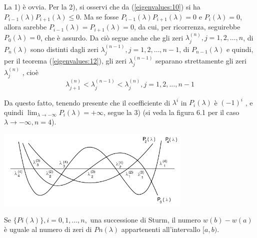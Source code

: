 \begin{thproof}
 La 1) \`e ovvia. Per la 2), si osservi che da
(\ref{eigenvalues:10}) si ha $P_{i−1} (\lambda)P_{i+1}(\lambda) \leq 0$.
Ma se fosse $P_{i−1} (\lambda)P_{i+1} (\lambda) = 0 $ e $P_i (\lambda)
= 0$, allora sarebbe $P_{i−1} (\lambda) = P_{i+1} (\lambda) = 0$, da
cui, per ricorrenza, seguirebbe $P_0 (\lambda) = 0$, che \`e assurdo.
Da ci\`o segue anche che gli zeri $\lambda_j^{(n)} , j = 1, 2, \ldots , n$,
 di $P_n (\lambda)$ sono distinti dagli zeri
$\lambda_j^{(n-1)}, j = 1, 2, \ldots , n - 1$, di $P_{n−1} (\lambda)$ e quindi,
 per il teorema (\ref{eigenvalues:12}), gli zeri $\lambda_j^{(n-1)}$ separano
strettamente gli zeri $\lambda_j^{(n)}$ , cio\`e
$$
\lambda_{j+1}^{(n)} < \lambda_{j}^{(n-1)} < \lambda_{j}^{(n)},
j=1,2,\ldots,n-1
$$

Da questo fatto, tenendo presente che il coefficiente di
$\lambda^i$ in $P_i(\lambda)$ \`e $(−1)^i$ ,
e quindi $\displaystyle \lim_{\lambda \to - \infty}P_i(\lambda) = +\infty$,
segue la 3) (si veda la figura 6.1 per il caso
$\lambda \to -\infty,n = 4$).
\begin{center}
\includegraphics[width=0.7\textwidth]{imgs/grafico01.png}
\end{center}
\end{thproof}

\begin{theo}[Sturm]
Se $\{Pi (\lambda)\}, i = 0, 1, . . . , n,$  una successione di Sturm,
il numero $w(b) − w(a)$ \`e uguale al numero di zeri di $Pn (\lambda)$
 appartenenti all’intervallo $[a, b)$.
\end{theo}

